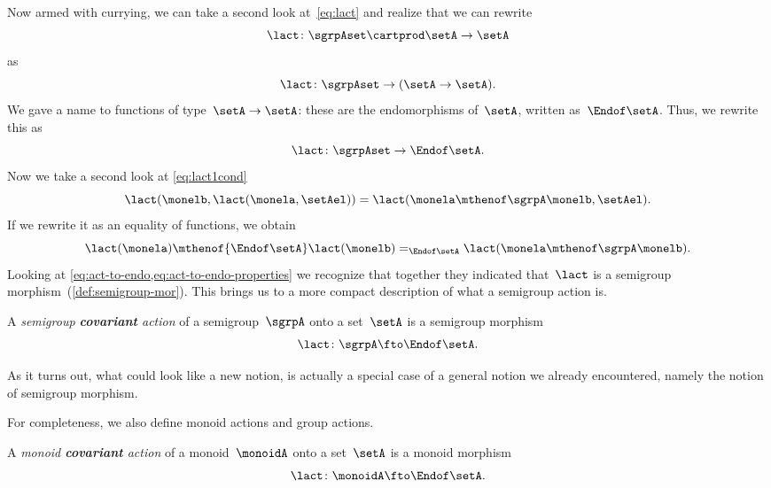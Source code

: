 Now armed with currying, we can take a second look at~\cref{eq:lact} and realize that we can rewrite
\begin{equation}
    \label{eq:currying-lact-1}
    \lact \colon \sgrpAset \cartprod \setA \to \setA
\end{equation}
as
\begin{equation}
    \label{eq:currying-lact-2}
    \lact \colon \sgrpAset \to (\setA \to \setA).
\end{equation}
%
We gave a name to functions of type~$\setA \to \setA$: these are the endomorphisms of~$\setA$, written as~$\Endof\setA$.
Thus, we rewrite this as
%
\begin{equation}
    \label{eq:act-to-endo}
    \lact \colon \sgrpAset \to \Endof\setA.
\end{equation}
%
Now we take a second look at \cref{eq:lact1cond}
%
\begin{equation}
    \label{eq:lact1cond-2}
    \lact(\monelb, \lact(\monela, \setAel)) = \lact(\monela \mthenof\sgrpA \monelb, \setAel).
\end{equation}
%
If we rewrite it as an equality of functions, we obtain
%
\begin{equation}
    \label{eq:act-to-endo-properties}
    \lact(\monela) \mthenof{\Endof\setA}  \lact(\monelb) =_{\Endof\setA} \lact(\monela \mthenof\sgrpA \monelb).
\end{equation}
%
Looking at \cref{eq:act-to-endo,eq:act-to-endo-properties} we recognize that together they indicated that~$\lact$ is a semigroup morphism~(\cref{def:semigroup-mor}).
This brings us to a more compact description of what a semigroup action is.

\begin{ctdefinition}
    \label{def:semigroup-cov-action}
    A \emph{semigroup \textbf{covariant} action} of a semigroup~$\sgrpA$ onto a set~$\setA$ is a semigroup morphism
    \begin{equation}
        \label{eq:act-semigroup}
        \lact \colon \sgrpA \fto \Endof\setA.
    \end{equation}
\end{ctdefinition}

As it turns out, what could look like a new notion, is actually a special case of a general notion we already encountered, namely the notion of semigroup morphism.

For completeness, we also define monoid actions and group actions.

\begin{ctdefinition}
    \label{def:monoid-cov-action}
    A \emph{monoid \textbf{covariant} action} of a monoid~$\monoidA$ onto a set~$\setA$ is a monoid morphism
    \begin{equation}
        \label{eq:act-monoid}
        \lact \colon \monoidA \fto \Endof\setA.
    \end{equation}
\end{ctdefinition}

